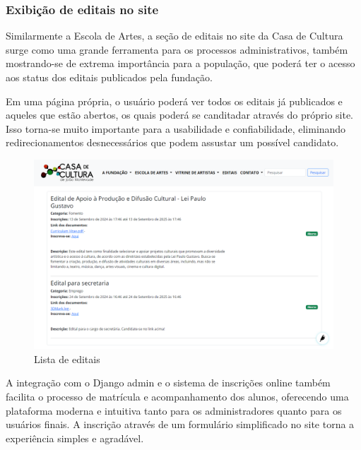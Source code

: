\subsubsection{Exibição de editais no site}

Similarmente a Escola de Artes, a seção de editais no site da Casa de Cultura surge como uma grande ferramenta para os processos administrativos, também mostrando-se de extrema importância para a população, que poderá ter o acesso aos status dos editais publicados pela fundação.

Em uma página própria, o usuário poderá ver todos os editais já publicados e aqueles que estão abertos, os quais poderá se canditadar através do próprio site. Isso torna-se muito importante para a usabilidade e confiabilidade, eliminando redirecionamentos desnecessários que podem assustar um possível candidato.

\begin{figure}[htb]
	\caption{\label{fig_grafico}Lista de editais}
	\begin{center}
	    \includegraphics[scale=0.35]{./img/lista_editais.png}
	\end{center}
\end{figure}

A integração com o Django admin e o sistema de inscrições online também facilita o processo de matrícula e acompanhamento dos alunos, oferecendo uma plataforma moderna e intuitiva tanto para os administradores quanto para os usuários finais. A inscrição através de um formulário simplificado no site torna a experiência simples e agradável.

